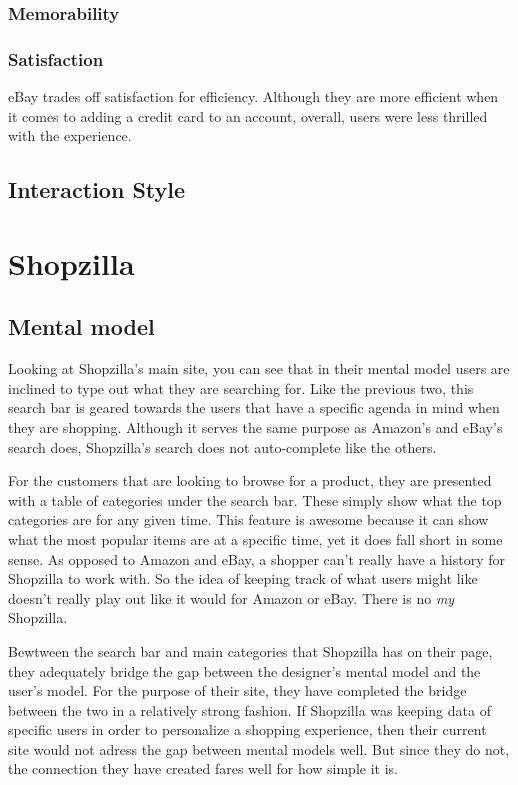 \documentclass[11pt, oneside]{article}
\begin{document}
\subsubsection{Memorability}

\subsubsection{Satisfaction}
eBay trades off satisfaction for efficiency. Although they are more efficient when it comes to adding a credit card to an account, overall, users were less thrilled with the experience.

\subsection{Interaction Style}


\pagebreak

\section{Shopzilla}

\subsection{Mental model}

Looking at Shopzilla's main site, you can see that in their mental model users are inclined to type out what they are searching for. Like the previous two, this search bar is geared towards the users that have a specific agenda in mind when they are shopping. Although it serves the same purpose as Amazon's and eBay's search does, Shopzilla's search does not auto-complete like the others.

For the customers that are looking to browse for a product, they are presented with a table of categories under the search bar. These simply show what the top categories are for any given time. This feature is awesome because it can show what the most popular items are at a specific time, yet it does fall short in some sense. As opposed to Amazon and eBay, a shopper can't really have a history for Shopzilla to work with. So the idea of keeping track of what users might like doesn't really play out like it would for Amazon or eBay. There is no \textit{my} Shopzilla.

Bewtween the search bar and main categories that Shopzilla has on their page, they adequately bridge the gap between the designer's mental model and the user's model. For the purpose of their site, they have completed the bridge between the two in a relatively strong fashion. If Shopzilla was keeping data of specific users in order to personalize a shopping experience, then their current site would not adress the gap between mental models well. But since they do not, the connection they have created fares well for how simple it is.
\end{document}
